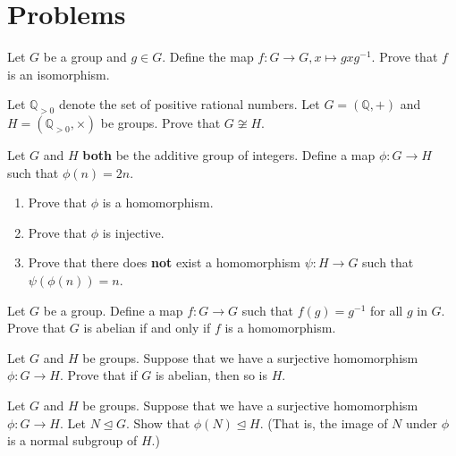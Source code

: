 \newpage

\section{Problems}
\begin{problem}
    Let $G$ be a group and $g \in G$. Define the map $f: G \to G, x \mapsto gxg^{-1}$. Prove that $f$ is an isomorphism.
\end{problem}

\begin{problem}
    Let $\mathbb{Q}_{>0}$ denote the set of positive rational numbers. Let $G = (\mathbb{Q}, +)$ and $H = (\mathbb{Q}_{>0}, \times)$ be groups. Prove that $G \not\cong H$.
\end{problem}

\begin{problem}
    Let $G$ and $H$ \textbf{both} be the additive group of integers. Define a map $\phi: G \to H$ such that $\phi(n) = 2n$.
    \begin{enumerate}[label=(\alph*)]
        \item Prove that $\phi$ is a homomorphism.
        \item Prove that $\phi$ is injective.
        \item Prove that there does \textbf{not} exist a homomorphism $\psi: H \to G$ such that $\psi(\phi(n)) = n$.
    \end{enumerate}
\end{problem}

\begin{problem}
    Let $G$ be a group. Define a map $f: G \to G$ such that $f(g) = g^{-1}$ for all $g$ in $G$. Prove that $G$ is abelian if and only if $f$ is a homomorphism.
\end{problem}

\begin{problem}
    Let $G$ and $H$ be groups. Suppose that we have a surjective homomorphism $\phi: G \to H$. Prove that if $G$ is abelian, then so is $H$.
\end{problem}

\begin{problem}
    Let $G$ and $H$ be groups. Suppose that we have a surjective homomorphism $\phi: G \to H$. Let $N \unlhd G$. Show that $\phi(N) \unlhd H$.\newline
    (That is, the image of $N$ under $\phi$ is a normal subgroup of $H$.)
\end{problem}

\newpage

